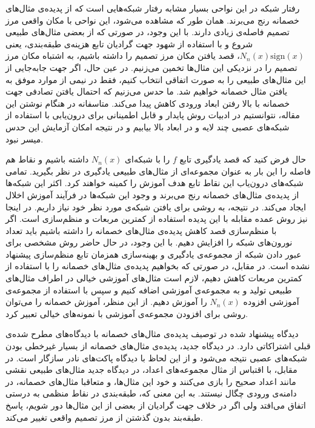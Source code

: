 \documentclass[12pt,onecolumn,a4paper]{article}
\begin{document}
رفتار شبکه در این نواحی بسیار مشابه رفتار شبکه‌هایی است که از پدیده‌ی مثال‌های خصمانه رنج می‌برند. همان طور که مشاهده می‌شود، این نواحی با مکان واقعی مرز تصمیم فاصله‌ی زیادی دارند. با این وجود، در صورتی که از بعضی مثال‌های طبیعی شروع و با استفاده از شهود جهت گرادیان تابع هزینه‌ی طبقه‌بندی، یعنی $N_n(x)\mathrm{sign}(x)$، قصد یافتن مکان مرز تصمیم را داشته باشیم، به اشتباه مکان مرز تصمیم را در نزدیکی این مثال‌ها تخمین می‌زنیم. در عین حال، اگر جهت جابه‌جایی از این مثال‌های طبیعی را به صورت اتفاقی انتخاب کنیم، فقط در نیمی از موارد موفق به یافتن مثال خصمانه خواهیم شد. ما حدس می‌زنیم که احتمال یافتن تصادفی جهت خصمانه با بالا رفتن ابعاد ورودی کاهش پیدا می‌کند. متاسفانه در هنگام نوشتن این مقاله، نتوانستیم در ادبیات روش پایدار و قابل اطمینانی برای درون‌یابی با استفاده از شبکه‌های عصبی چند لایه و در ابعاد بالا بیابیم و در نتیجه امکان آزمایش این حدس میسر نبود.

حال فرض کنید که قصد یادگیری تابع $f$ را با شبکه‌ای $N_n(x)$ داشته باشیم و نقاط هم فاصله را این بار به عنوان مجموعه‌ای از مثال‌های طبیعی یادگیری در نظر بگیرید. تمامی شبکه‌های درون‌یاب این نقاط تابع هدف آموزش را کمینه خواهند کرد. اکثر این شبکه‌ها از پدیده‌ی مثال‌های خصمانه رنج می‌برند و وجود این شبکه‌ها در فرآیند آموزش اخلال ایجاد می‌کند. در نتیجه، به روشی برای یافتن شبکه‌ی مورد نظر خود نیاز داریم. در اینجا نیز روش عمده مقابله با این پدیده استفاده از کمترین مربعات و منظم‌سازی است. اگر با منظم‌سازی قصد کاهش پدیده‌ی مثال‌های خصمانه را داشته باشیم باید تعداد نورون‌های شبکه را افزایش دهیم. با این وجود، در حال حاضر روش مشخصی برای عبور دادن شبکه از مجموعه‌ی یادگیری و بهینه‌سازی همزمان تابع منظم‌سازی پیشنهاد نشده است. در مقابل، در صورتی که بخواهیم پدیده‌ی مثال‌های خصمانه را با استفاده از کمترین مربعات کاهش دهیم، لازم است مثال‌های آموزشی خیالی در اطراف مثال‌های طبیعی تولید و به مجموعه‌ی آموزشی اضافه کنیم و سپس با استفاده از مجموعه‌ی آموزشی افزوده $N_n(x)$ را آموزش دهیم. از این منظر، آموزش خصمانه را می‌توان روشی برای افزودن مجموعه‌ی آموزشی با نمونه‌های خیالی تعبیر کرد.

دیدگاه پیشنهاد شده در توصیف پدیده‌ی مثال‌های خصمانه با دیدگاه‌های مطرح شده‌ی قبلی اشتراکاتی دارد. در دیدگاه جدید، پدیده‌ی مثال‌های خصمانه از بسیار غیرخطی بودن شبکه‌های عصبی نتیجه می‌شود و از این لحاظ با دیدگاه پاکت‌های نادر سازگار است. در مقابل، با اقتباس از مثال مجموعه‌های اعداد، در دیدگاه جدید مثال‌های طبیعی نقشی مانند اعداد صحیح را بازی می‌کنند و خود این مثال‌ها، و متعاقبا مثال‌های خصمانه، در دامنه‌ی ورودی چگال نیستند. به این معنی که، طبقه‌بندی در نقاط منظمی به درستی اتفاق می‌افتد ولی اگر در خلاف جهت گرادیان از بعضی از این مثال‌ها دور شویم، پاسخ طبقه‌بند بدون گذشتن از مرز تصمیم واقعی تغییر می‌کند.
\end{document}
